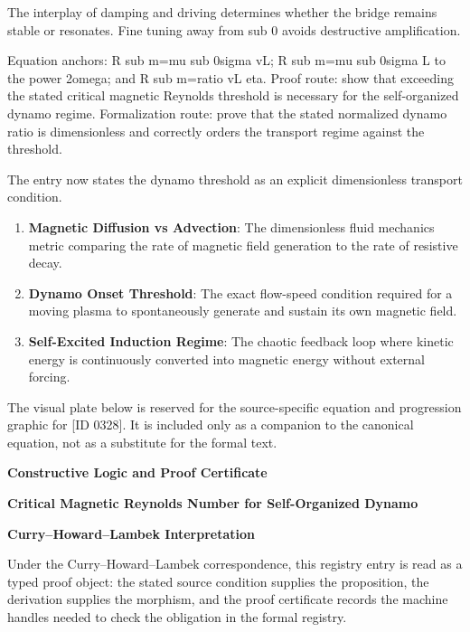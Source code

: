 The interplay of damping and driving determines whether the bridge remains stable or resonates. Fine tuning away from sub 0 avoids destructive amplification.

Equation anchors: R sub m=mu sub 0sigma vL; R sub m=mu sub 0sigma L to the power 2omega; and R sub m=ratio vL eta. Proof route: show that exceeding the stated critical magnetic Reynolds threshold is necessary for the self-organized dynamo regime. Formalization route: prove that the stated normalized dynamo ratio is dimensionless and correctly orders the transport regime against the threshold.

The entry now states the dynamo threshold as an explicit dimensionless transport condition.
\endgroup

\begin{enumerate}[leftmargin=1.6em,itemsep=6pt,topsep=4pt]
\item \textbf{Magnetic Diffusion vs Advection}: The dimensionless fluid mechanics metric comparing the rate of magnetic field generation to the rate of resistive decay.
\item \textbf{Dynamo Onset Threshold}: The exact flow-speed condition required for a moving plasma to spontaneously generate and sustain its own magnetic field.
\item \textbf{Self-Excited Induction Regime}: The chaotic feedback loop where kinetic energy is continuously converted into magnetic energy without external forcing.
\end{enumerate}

\begingroup\footnotesize\sloppy
The visual plate below is reserved for the source-specific equation and progression graphic for [ID 0328]. It is included only as a companion to the canonical equation, not as a substitute for the formal text.
\par\endgroup
\ifTZPDarkEdition
{}
\fi

\clearpage
\begingroup\tzpsupportsetup
\noindent\textbf{\fontsize{10.8pt}{12.8pt}\selectfont [ID 0328] Constructive Logic and Proof Certificate}\par
\noindent\textbf{\fontsize{10pt}{12pt}\selectfont Critical Magnetic Reynolds Number for Self-Organized Dynamo}\par
\vspace{0.45em}
\begingroup
\footnotesize
\setlength{\parskip}{0.22em}
\setlength{\parindent}{0pt}
\noindent\textbf{Curry--Howard--Lambek Interpretation}\par
Under the Curry--Howard--Lambek correspondence, this registry entry is read as a typed proof
object: the stated source condition supplies the proposition, the derivation supplies the
morphism, and the proof certificate records the machine handles needed to check the obligation
in the formal registry.

